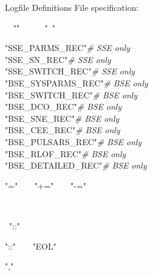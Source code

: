 \bigskip
Logfile Definitions File specification:

\hfill
\begin{minipage}{\dimexpr\textwidth-2em}
    \setlength{\parskip}{6pt}
    \rab\tabto{7em}{::=}\tabto{9em}\lcb{}\rab\rcb

    \rab\tabto{7em}{::=}\tabto{9em}\rab\ \rab\ "\lcb"\ \lcb\ \lsb\ \rab\ \rsb\ \rcb\ "\ \rcb"\ \rab

    \rab\tabto{7em}{::=}\tabto{9em}"SSE\_PARMS\_REC"\tabto{23em}\textbar\tabto{28em}\textit{\# SSE only} \\
    \tabto{9em}"SSE\_SN\_REC"\tabto{23em}\textbar\tabto{28em}\textit{\# SSE only} \\
    \tabto{9em}"SSE\_SWITCH\_REC"\tabto{23em}\textbar\tabto{28em}\textit{\# SSE only} \\
    \tabto{9em}"BSE\_SYSPARMS\_REC"\tabto{23em}\textbar\tabto{28em}\textit{\# BSE only} \\
    \tabto{9em}"BSE\_SWITCH\_REC"\tabto{23em}\textbar\tabto{28em}\textit{\# BSE only} \\       \tabto{9em}"BSE\_DCO\_REC"\tabto{23em}\textbar\tabto{28em}\textit{\# BSE only} \\
    \tabto{9em}"BSE\_SNE\_REC"\tabto{23em}\textbar\tabto{28em}\textit{\# BSE only} \\
    \tabto{9em}"BSE\_CEE\_REC"\tabto{23em}\textbar\tabto{28em}\textit{\# BSE only} \\
    \tabto{9em}"BSE\_PULSARS\_REC"\tabto{23em}\textbar\tabto{28em}\textit{\# BSE only} \\
    \tabto{9em}"BSE\_RLOF\_REC"\tabto{23em}\textbar\tabto{28em}\textit{\# BSE only} \\
    \tabto{9em}"BSE\_DETAILED\_REC"\tabto{23em}\textbar\tabto{28em}\textit{\# BSE only}

    \rab\tabto{7em}{::=}\tabto{9em}"="\ \ \textbar\ \ "+="\ \ \textbar\ \ "-="

    \rab\tabto{7em}{::=}\tabto{9em}\rab\ \lsb\ \rab\  \rab\ \rsb

    \rab\tabto{7em}{::=}\tabto{9em}\rab\ "::"\ \rab\  \rab

    \rab\tabto{7em}{::=}\tabto{9em}"::"\ \ \textbar\ \ "EOL"

    \rab\tabto{7em}{::=}\tabto{9em}","\ \ \textbar\ \ \rab


\end{minipage}
